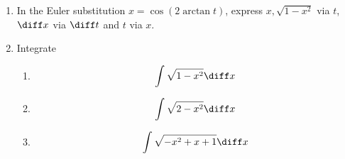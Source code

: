 \begin{enumerate}
\item In the Euler substitution $x=\cos (2\arctan t)$, express  $x,\sqrt{1-x^2} $ via $t$, $\diff x$ via $\diff t$ and $t$ via $x$.
\item Integrate
\begin{enumerate}
\item 
\[
\int \sqrt{1-x^2}\diff x
\]
\item 
\[
\int \sqrt{2-x^2}\diff x
\]
\item 
\[
\int \sqrt{-x^2+x+1}\diff x
\]
\end{enumerate}


\end{enumerate}
